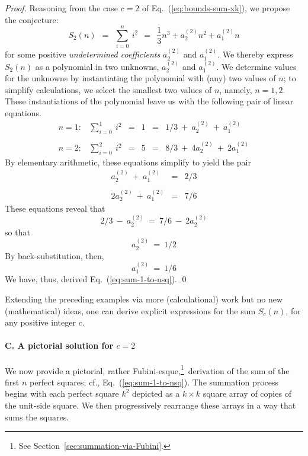 \begin{proof}
Reasoning from the case $c=2$ of Eq.~(\ref{eq:bounds-sum-xk}), we propose the conjecture:
\begin{equation}
\label{eq:symbolic-cubic}
S_2(n) \ \ = \ \
\sum_{i=0}^n \ i^2 \ \ = \ \ \frac{1}{3} n^3 + a^{(2)}_2 n^2 + a^{(2)}_1 n
\end{equation}
for some positive {\it undetermined coefficients} $a^{(2)}_2$ and $a^{(2)}_1$.  We thereby express $S_2(n)$ as a polynomial in two unknowns, $a^{(2)}_2$ and $a^{(2)}_1$.  We determine values for the unknowns by instantiating the polynomial with (any) two values of $n$; to simplify calculations, we select the smallest two values of $n$, namely, $n = 1,2$.  These instantiations of the polynomial leave us with the following pair of linear equations.
\[
\begin{array}{cccccl}
n=1: & \sum_{i=0}^1 \ i^2
   & = & 1 & = &
1/3 \ + \ a^{(2)}_2 \ + \ a^{(2)}_1 \\
 & & & & & \\
n=2: & \sum_{i=0}^2 \ i^2
   & = & 5 & = &
8/3 \ + \ 4 a^{(2)}_2 \ + \ 2 a^{(2)}_1
\end{array}
\]
By elementary arithmetic, these equations simplify to yield the pair
\[
\begin{array}{ccc}
a^{(2)}_2 \ + \ a^{(2)}_1   & = & 2/3 \\
 & & \\
2 a^{(2)}_2 \ + \ a^{(2)}_1 & = & 7/6
\end{array}
\]
These equations reveal that
\[ 2/3 \ - \ a^{(2)}_2 \ = \ 7/6 \ - \ 2 a^{(2)}_2 \]
so that 
\[ a^{(2)}_2 \ = \ 1/2 \]
By back-substitution, then,
\[ a^{(2)}_1 \ = \ 1/6 \]
We have, thus, derived Eq.~(\ref{eq:sum-1-to-nsq}).  \qed
\end{proof}

\medskip

Extending the preceding examples via more (calculational) work but no new (mathematical) ideas, one can derive explicit expressions for the sum $S_c(n)$, for any positive integer $c$.

\medskip 

\paragraph{C. A pictorial solution for $c=2$}

We now provide a pictorial, rather Fubini-esque,\footnote{See Section~\ref{sec:summation-via-Fubini}.}~derivation of the sum of the first $n$ perfect squares; cf., Eq.~(\ref{eq:sum-1-to-nsq}).  The summation process begins with each perfect square $k^2$ depicted as a $k \times k$ square array of copies of the unit-side square.  We then progressively rearrange these arrays in a way that sums the squares. 

